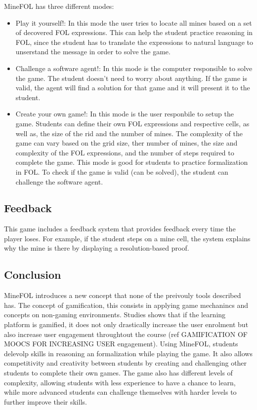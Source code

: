 MineFOL has three different modes:
\begin{itemize}
    \item Play it yourself!: In this mode the user tries to locate all mines based on a set of decovered \gls{FOL} expressions. This can help the student practice reasoning in \gls{FOL}, since the student has to translate the expressions to natural language to unserstand the message in order to solve the game.
    \item Challenge a software agent!: In this mode is the computer responsible to solve the game. The student doesn't need to worry about anything. If the game is valid, the agent will find a solution for that game and it will present it to the student.
    \item Create your own game!: In this mode is the user responbile to setup the game. Students can define their own \gls{FOL} expressions and respective cells, as well as, the size of the rid and the number of mines. The complexity of the game can vary based on the grid size, ther number of mines, the size and complexity of the \gls{FOL} expressions, and the number of steps required to complete the game.
    This mode is good for students to practice formalization in \gls{FOL}. To check if the game is valid (can be solved), the student can challenge the software agent.
\end{itemize}

\subsection{Feedback}
This game includes a feedback system that provides feedback every time the player loses. For example, if the student steps on a mine cell, the system explains why the mine is there by displaying a resolution-based proof.

\subsection{Conclusion}
MineFOL introduces a new concept that none of the preivouly tools described has. The concept of gamification, this consists in applying game mechanincs and concepts on non-gaming environments. Studies shows that if the learning platform is gamified, it does not only drastically increase the user enrolment but also increase user engagement throughtout the course (ref GAMIFICATION OF MOOCS FOR INCREASING USER engagement). Using MineFOL, students delevolp skills in reasoning an formalization while playing the game. It also allows competitivity and creativity between students by creating and challenging other students to complete their own games. The game also has different levels of complexity, allowing students with less experience to have a chance to learn, while more advanced students can challenge themselves with harder levels to further improve their skills.


